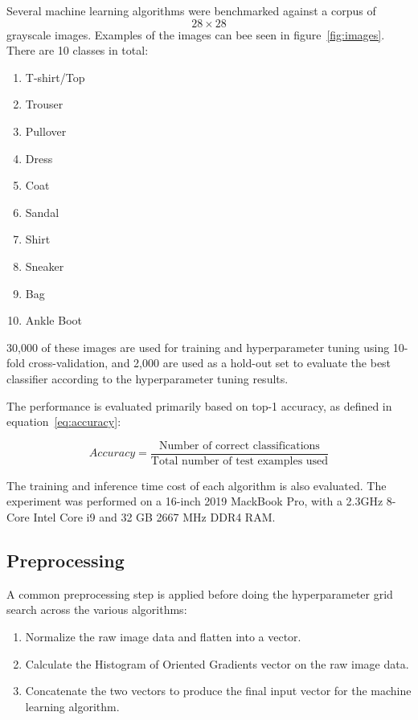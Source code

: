 \documentclass[landscape,twocolumn]{article}
\begin{document}
Several machine learning algorithms were benchmarked against a corpus of \[28 \times 28\] grayscale images. Examples of the images can bee seen in figure~\ref{fig:images}. There are 10 classes in total:
\begin{enumerate}
\item T-shirt/Top
\item Trouser
\item Pullover
\item Dress
\item Coat
\item Sandal
\item Shirt
\item Sneaker
\item Bag
\item Ankle Boot
\end{enumerate}

30,000 of these images are used for training and hyperparameter tuning using 10-fold cross-validation, and 2,000 are used as a hold-out set to evaluate the best classifier according to the hyperparameter tuning results.

The performance is evaluated primarily based on top-1 accuracy, as defined in equation~\ref{eq:accuracy}:

\begin{equation}
\label{eq:accuracy}
Accuracy = \frac{\text{Number of correct classifications}}{\text{Total number of test examples used}}
\end{equation}

The training and inference time cost of each algorithm is also evaluated. The experiment was performed on a 16-inch 2019 MackBook Pro, with a 2.3GHz 8-Core Intel Core i9 and 32 GB 2667 MHz DDR4 RAM\@.

\subsection{Preprocessing}
A common preprocessing step is applied before doing the hyperparameter grid search across the various algorithms:
\begin{enumerate}
\item Normalize the raw image data and flatten into a vector.
\item Calculate the Histogram of Oriented Gradients vector on the raw image data.
\item Concatenate the two vectors to produce the final input vector for the machine learning algorithm.
\end{enumerate}
\end{document}
